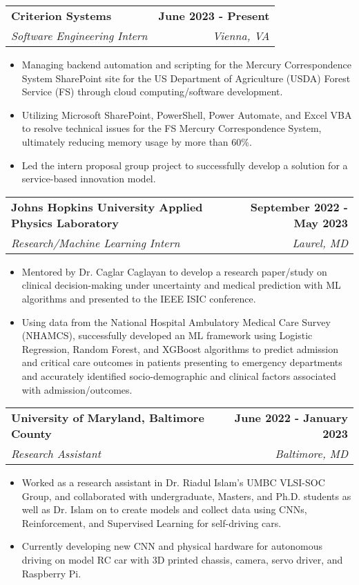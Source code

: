 \documentclass[letterpaper,11pt]{article}
\makeatletter
\newcommand{\resumeItem}[1]{
  \item\small{
    {#1 \vspace{-2pt}}
  }
}
\newcommand{\resumeSubheading}[4]{
  \vspace{-2pt}\item
    \begin{tabular*}{1.0\textwidth}[t]{l@{\extracolsep{\fill}}r}
      \textbf{#1} & \textbf{\small #2} \\
      \textit{\small#3} & \textit{\small #4} \\
    \end{tabular*}\vspace{-7pt}
}
\newcommand{\resumeItemListStart}{\begin{itemize}}
\newcommand{\resumeItemListEnd}{\end{itemize}\vspace{-5pt}}
\makeatother
\begin{document}
    \resumeSubheading
        {Criterion Systems}{June 2023 - Present} 
        {Software Engineering Intern}{Vienna, VA}
    \resumeItemListStart
        \resumeItem{Managing backend automation and scripting for the Mercury Correspondence System SharePoint site for the US Department of Agriculture (USDA) Forest Service (FS) through cloud computing/software development.}
        \resumeItem{Utilizing Microsoft SharePoint, PowerShell, Power Automate, and Excel VBA to resolve technical issues for the FS Mercury Correspondence System, ultimately reducing memory usage by more than 60\%.}
        \resumeItem{Led the intern proposal group project to successfully develop a solution for a service-based innovation model.}
                              \resumeItemListEnd
          \vspace{-2pt}

    \resumeSubheading
        {Johns Hopkins University Applied Physics Laboratory}{September 2022 - May 2023} 
        {Research/Machine Learning Intern}{Laurel, MD}
      \resumeItemListStart
        \resumeItem{Mentored by Dr. Caglar Caglayan to develop a research paper/study on clinical decision-making under uncertainty and medical prediction with ML algorithms and presented to the IEEE ISIC conference.}
        \resumeItem{Using data from the National Hospital Ambulatory Medical Care Survey (NHAMCS), successfully developed an ML framework using Logistic Regression, Random Forest, and XGBoost algorithms to predict admission and critical care outcomes in patients presenting to emergency departments and accurately identified socio-demographic and clinical factors associated with admission/outcomes.}
                                    \resumeItemListEnd
          \vspace{-2pt}

    \resumeSubheading
        {University of Maryland, Baltimore County}{June 2022 - January 2023} 
        {Research Assistant}{Baltimore, MD}
      \resumeItemListStart
        \resumeItem{Worked as a research assistant in Dr. Riadul Islam's UMBC VLSI-SOC Group, and collaborated with undergraduate, Masters, and Ph.D. students as well as Dr. Islam on to create models and collect data using CNNs, Reinforcement, and Supervised Learning for self-driving cars.}
        \resumeItem{Currently developing new CNN and physical hardware for autonomous driving on model RC car with 3D printed chassis, camera, servo driver, and Raspberry Pi.}
                                    \resumeItemListEnd

    
  
\end{document}
